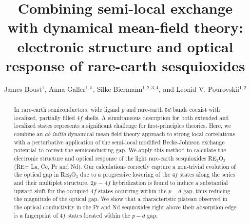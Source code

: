 \documentclass[aps,prb,twocolumn,amsmath,amssymb]{revtex4}
\begin{document}
\title{Combining semi-local exchange with dynamical mean-field theory:  electronic structure and optical response of rare-earth sesquioxides}
	
	\author{James Boust$^{1}$, Anna Galler$^{1,5}$, Silke Biermann$^{1,2,3,4}$, and Leonid V. Pourovskii$^{1,2}$}


        
\begin{abstract}
	In rare-earth semiconductors, wide ligand $p$ and rare-earth 5$d$ bands coexist with localized, partially filled 4$f$ shells. A simultaneous  description for both extended  and localized states   represents a significant challenge  for first-principles theories. Here, we combine an {\it ab initio} dynamical mean-field theory approach to strong local correlations with a perturbative application of the semi-local  modified Becke-Johnson exchange potential to correct the semiconducting gap. We apply this method to  calculate the electronic structure and optical response of  the light rare-earth sesquioxides RE$_2$O$_3$ (RE= La, Ce, Pr and Nd). Our calculations correctly capture a non-trivial evolution of the optical gap in RE$_2$O$_3$ due to a progressive lowering of the 4$f$ states along the series and their multiplet structure. 2$p$ $-$ 4$f$ hybridization is found to induce a substantial upward shift for the occupied 4$f$ states occurring within the $p-d$ gap, thus reducing the magnitude of the optical gap. We show that a characteristic plateau observed in the optical conductivity in the Pr and Nd sequioxides right above their absorption edge is a fingerprint of 4$f$ states located within the $p-d$ gap.
\end{abstract}
\maketitle
\end{document}
